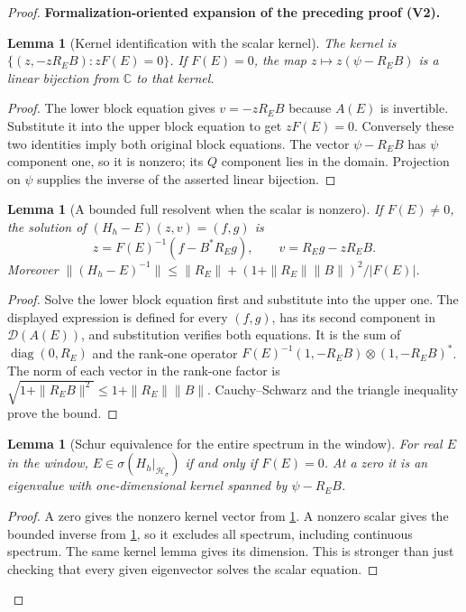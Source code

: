 \documentclass[11pt]{article}
\newtheorem{lemma}[theorem]{Lemma}
\newcommand{\formalisationparentid}{X}
\newenvironment{formalisationaddition}[1]{\par\medskip\begingroup\color{blue}\def\formalisationparentid{#1}\setcounter{formalizationsublemma}{0}\let\lemma\formalizationsublemma\let\endlemma\endformalizationsublemma
  \def\Eo{\mathcal E_h^\circ}\def\EE{\mathcal E_h}\def\phio{\phi_h^\circ}\def\phih{\phi_h}\def\Ho{H_h^{\rm atom}(v^\circ)}\def\Ha{H_h^{\rm atom}}\def\HL{H_h^{L}}\def\Dh{D_h}\def\Log{\operatorname{Log}}\def\ellh{\ell_h}\def\Gp{G_{p,h}}\def\Ast{A_{*,h}}\def\ahat{\widehat{\mathfrak a}_h}\def\ah{\mathfrak a_h}\def\rh{\widehat\rho_h}\def\deltah{\widehat\delta_h}\def\oldref##1{\textup{(##1)}}\def\interface##1{\par\noindent\textit{Analytical interface used here.} ##1\par}\def\finish{\par\noindent\textit{Conclusion of the formalization-oriented expansion.} }\par\noindent\textbf{Formalization-oriented expansion of the preceding proof (V2).}\par\smallskip
}{\par\endgroup\medskip
}
\newcommand{\C}{\mathbb C}
\begin{document}
\begin{proof}
\begin{formalisationaddition}{T4.7}
\begin{lemma}[Kernel identification with the scalar kernel]\label{sublemma:T4-7-kernel-map}
The kernel is
$\{(z,-zR_EB):zF(E)=0\}$. If $F(E)=0$, the map
$z\mapsto z(\psi-R_EB)$ is a linear bijection from $\C$ to that kernel.
\end{lemma}
\begin{proof}
The lower block equation gives $v=-zR_EB$ because $A(E)$ is invertible.
Substitute it into the upper block equation to get $zF(E)=0$.
Conversely these two identities imply both original block equations.
The vector $\psi-R_EB$ has $\psi$ component one, so it is nonzero;
its $Q$ component lies in the domain. Projection on $\psi$ supplies
the inverse of the asserted linear bijection.
\end{proof}

\begin{lemma}[A bounded full resolvent when the scalar is nonzero]\label{sublemma:T4-7-explicit-inverse}
If $F(E)\ne0$, the solution of $(H_h-E)(z,v)=(f,g)$ is
\[
 z=F(E)^{-1}(f-B^*R_Eg),\qquad v=R_Eg-zR_EB.
\]
Moreover
$\|(H_h-E)^{-1}\|\le\|R_E\|+(1+\|R_E\|\|B\|)^2/|F(E)|$.
\end{lemma}
\begin{proof}
Solve the lower block equation first and substitute into the upper one.
The displayed expression is defined for every $(f,g)$, has its second
component in $\mathcal D(A(E))$, and substitution verifies both equations.
It is the sum of $\operatorname{diag}(0,R_E)$ and the rank-one operator
$F(E)^{-1}(1,-R_EB)\otimes(1,-R_EB)^*$.
The norm of each vector in the rank-one factor is
$\sqrt{1+\|R_EB\|^2}\le1+\|R_E\|\|B\|$.
Cauchy--Schwarz and the triangle inequality prove the bound.
\end{proof}

\begin{lemma}[Schur equivalence for the entire spectrum in the window]\label{sublemma:T4-7-schur}
For real $E$ in the window, $E\in\sigma(H_h|_{\mathcal H_\sigma})$
if and only if $F(E)=0$. At a zero it is an eigenvalue with one-dimensional
kernel spanned by $\psi-R_EB$.
\end{lemma}
\begin{proof}
A zero gives the nonzero kernel vector from
\ref{sublemma:T4-7-kernel-map}. A nonzero scalar gives the bounded
inverse from \ref{sublemma:T4-7-explicit-inverse}, so it excludes all
spectrum, including continuous spectrum. The same kernel lemma gives
its dimension. This is stronger than just checking that every given
eigenvector solves the scalar equation.
\end{proof}


\end{formalisationaddition}
\end{proof}
\end{document}
